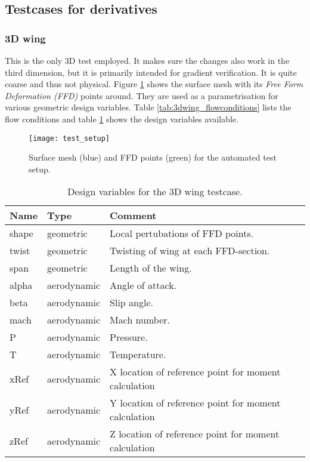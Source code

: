 \subsection{Testcases for derivatives}
\subsubsection{3D wing}
This is the only 3D test employed. It makes sure the changes also work in the
third dimension, but it is primarily intended for gradient verification. It is
quite coarse and thus not physical. Figure \ref{fig:3dwing_setup} shows the
surface mesh with its \textit{Free Form Deformation (FFD)} points around. They
are used as a parametrisation for various geometric design variables. Table
\ref{tab:3dwing_flowconditions} lists the flow conditions and table
\ref{tab:3dwing_dvs} shows the design variables available.

\begin{figure}[H] \centering
    \texttt{[image: test\_setup]}
    \caption{Surface mesh (blue) and FFD points (green) for the automated test
    setup. \cite{vt1}}
    \label{fig:3dwing_setup}
\end{figure}

\begin{table}[H]
    \centering
    \begin{tabular}{l l l}
        \toprule
        Name  & Type & Comment \\
        \toprule
        shape   & geometric   & Local pertubations of FFD points. \\
        twist   & geometric   & Twisting of wing at each FFD-section. \\
        span    & geometric   & Length of the wing. \\
        alpha   & aerodynamic & Angle of attack. \\
        beta    & aerodynamic & Slip angle. \\
        mach    & aerodynamic & Mach number. \\
        P       & aerodynamic & Pressure. \\
        T       & aerodynamic & Temperature. \\
        xRef    & aerodynamic & X location of reference point for moment
        calculation \\
        yRef    & aerodynamic & Y location of reference point for moment
        calculation \\
        zRef    & aerodynamic & Z location of reference point for moment
        calculation \\
        \bottomrule
    \end{tabular}
    \caption{Design variables for the 3D wing testcase.\label{tab:3dwing_dvs}}
\end{table}

